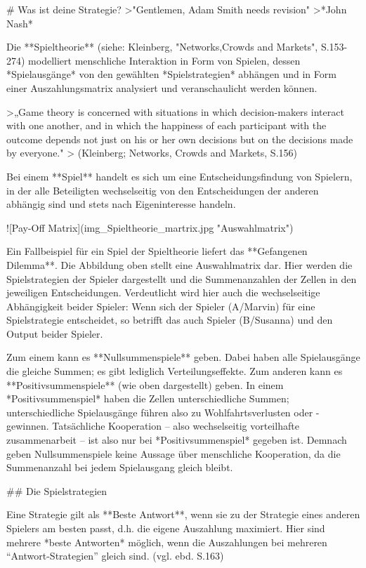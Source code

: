 # Was ist deine Strategie?
>"Gentlemen, Adam Smith needs revision"
>*John Nash*

Die **Spieltheorie** (siehe: Kleinberg, "Networks,Crowds and Markets", S.153-274) modelliert menschliche Interaktion in Form von Spielen, dessen *Spielausgänge* von den gewählten *Spielstrategien* abhängen und in Form einer Auszahlungsmatrix analysiert und veranschaulicht werden können.

>„Game theory is concerned with situations in which decision-makers interact with one another, and in which the happiness of each participant with the outcome depends not just on his or her own decisions but on the decisions made by everyone."
> (Kleinberg; Networks, Crowds and Markets, S.156)

Bei einem **Spiel** handelt es sich um eine Entscheidungsfindung von Spielern, in der alle Beteiligten wechselseitig von den Entscheidungen der anderen abhängig sind und stets nach Eigeninteresse handeln.

![Pay-Off Matrix](img\Kleinber_Spieltheorie_martrix.jpg "Auswahlmatrix")

Ein Fallbeispiel für ein Spiel der Spieltheorie liefert das **Gefangenen Dilemma**.
Die Abbildung oben stellt eine Auswahlmatrix dar.
Hier werden die Spielstrategien der Spieler dargestellt und die Summenanzahlen der Zellen in den jeweiligen Entscheidungen.
Verdeutlicht wird hier auch die wechselseitige Abhängigkeit beider Spieler: Wenn sich der Spieler (A/Marvin) für eine Spielstrategie entscheidet, so betrifft das auch Spieler (B/Susanna) und den Output beider Spieler.

Zum einem kann es **Nullsummenspiele** geben.
Dabei haben alle Spielausgänge die gleiche Summen; es gibt lediglich Verteilungseffekte.
Zum anderen kann es **Positivsummenspiele** (wie oben dargestellt) geben.
In einem *Positivsummenspiel* haben die Zellen unterschiedliche Summen; unterschiedliche Spielausgänge führen also zu Wohlfahrtsverlusten oder -gewinnen.
Tatsächliche Kooperation – also wechselseitig vorteilhafte zusammenarbeit – ist also nur bei *Positivsummenspiel* gegeben ist.
Demnach geben Nullsummenspiele keine Aussage über menschliche Kooperation, da die Summenanzahl bei jedem Spielausgang gleich bleibt.

## Die Spielstrategien

Eine Strategie gilt als **Beste Antwort**, wenn sie zu der Strategie eines anderen Spielers am besten passt, d.h. die eigene Auszahlung maximiert.
Hier sind mehrere *beste Antworten* möglich, wenn die Auszahlungen bei mehreren “Antwort-Strategien” gleich sind. (vgl. ebd. S.163)

